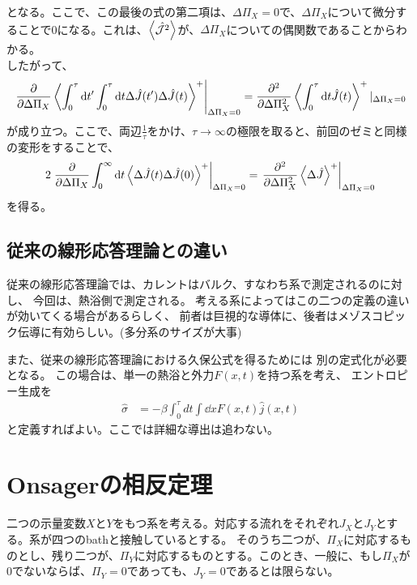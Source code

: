 \documentclass[a4paper,11pt]{jsarticle}
\begin{document}
となる。ここで、この最後の式の第二項は、$\Delta \Pi_X=0$で、$\Delta \Pi_X$について微分することで0になる。これは、$\ev{\hat{\mathcal{J}^2}}$が、$\Delta \Pi_X$についての偶関数であることからわかる。\\
したがって、
\begin{align} 
    \left.\pdv{\Delta \Pi_X} \ev{\int_0 ^{\tau} \dd t' \int_0 ^{\tau} \dd t \Delta \hat{J}(t')\Delta \hat{J}(t)}^+\right|_{\Delta \Pi_X = 0} = \pdv[2]{\Delta \Pi_X} \ev{\int_0 ^{\tau} \dd t \hat{J}(t)}^+|_{\Delta \Pi_X = 0}
\end{align}
が成り立つ。ここで、両辺$\frac{1}{\tau}$をかけ、$\tau \to \infty$の極限を取ると、前回のゼミと同様の変形をすることで、
\begin{align}
    2\left.\pdv{\Delta \Pi_X} \int_0 ^{\infty} \dd t \ev{\Delta \hat{J}(t) \Delta \hat{J}(0)}^+\right|_{\Delta \Pi_X = 0} = \left.\pdv[2]{\Delta \Pi_X} \ev{\Delta \hat{J}}^+\right|_{\Delta \Pi_X = 0}
\end{align}
を得る。\hfill \qedsymbol

\subsection{従来の線形応答理論との違い}
従来の線形応答理論では、カレントはバルク、すなわち系で測定されるのに対し、
今回は、熱浴側で測定される。
考える系によってはこの二つの定義の違いが効いてくる場合があるらしく、
前者は巨視的な導体に、後者はメゾスコピック伝導に有効らしい。(多分系のサイズが大事)

また、従来の線形応答理論における久保公式を得るためには
別の定式化が必要となる。
この場合は、単一の熱浴と外力$F(x,t)$を持つ系を考え、
エントロピー生成を
\begin{align}
    \hat{\sigma} &= -\beta \int_0 ^{\tau} dt \int \dd{x} F(x,t) \hat{j}(x,t)
\end{align}
と定義すればよい。ここでは詳細な導出は追わない。

\section{Onsagerの相反定理}
二つの示量変数$X$と$Y$をもつ系を考える。対応する流れをそれぞれ$J_X$と$J_Y$とする。系が四つのbathと接触しているとする。
そのうち二つが、$\Pi_X$に対応するものとし、残り二つが、$\Pi_Y$に対応するものとする。このとき、一般に、もし$\Pi_X$が$0$でないならば、$\Pi_Y=0$であっても、$J_Y=0$であるとは限らない。\\
\end{document}
